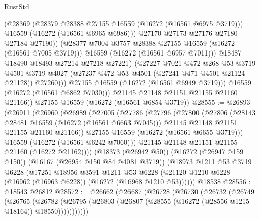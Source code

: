 \begin{lexlean}{RustStd}
\begin{coremodule}
                        (@28369
                          (@28379 @28388 @27155 @16559 (@16272 (@16561 @6975 @3719)))
                          @16559
                          (@16272 (@16561 @6965 @6986)))
                        @27170
                        @27173
                        @27176
                        @27180
                        @27184
                        @27190))
                    (@28377 @7004 @3757 @28388 @27155 @16559 (@16272 (@16561 @7005 @3719)))
                    @16559
                    (@16272 (@16561 @6957 @7011)))
                  @18487
                  @18490
                  @18493
                  @27214
                  @27218
                  @27221)
                (@27227
                  @7021
                  @472
                  @268
                  @53
                  @3719
                  @4501
                  @3719
                  @4027
                  (@27237 @472 @53 @4501 (@27241 @471 @4501 @21124 @21128))
                  @27260)))
            @27155
            @16559
            (@16272 (@16561 @6949 @3719)))
          @16559
          (@16272 (@16561 @6862 @7030)))
        @21145
        @21148
        @21151
        @21155
        @21160
        @21166))
    @27155
    @16559
    (@16272 (@16561 @6854 @3719))
@28555 := @26893
    (@26911
      (@26960
        (@26989
          (@27005
            (@27786
              (@27796
                (@27800
                  (@27806
                    (@28143 @28481 @16559 (@16272 (@16561 @6663 @7045)))
                    @21145
                    @21148
                    @21151
                    @21155
                    @21160
                    @21166))
                @27155
                @16559
                (@16272 (@16561 @6655 @3719)))
              @16559
              (@16272 (@16561 @6242 @7060)))
            @21145
            @21148
            @21151
            @21155
            @21160
            (@16272 @21162))))
      (@18373 (@26942 @50))
      (@16272 (@26947 @159 @150))
      (@16167 (@26954 @150 @84 @4081 @3719))
      (@18973
        @1211
        @53
        @3719
        @6228
        (@17251
          @18956
          @3591
          @1211
          @53
          @6228
          (@21120 @1210 @6228 (@16962 (@16963 @6228)) (@16272 (@16968 @1210 @53))))))
    @18538
@28556 := @18543 @26812
@28572 := @26662
    (@26687
      (@26728
        (@26730
          (@26732
            (@26749
              (@26765
                (@26782
                  (@26795 (@26803 (@26807 (@28555 (@16272 (@28556 @1215 @18164)) @18550)))))))))))

\end{coremodule}
\end{lexlean}
